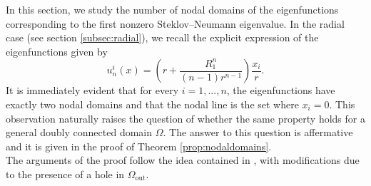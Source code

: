 \documentclass[12pt,reqno]{amsart}
\numberwithin{equation}{section}
\numberwithin{theorem}{section}
\numberwithin{equation}{section}
\numberwithin{theorem}{section}
\begin{document}
In this section, we study the number of nodal domains of the eigenfunctions corresponding to the first nonzero Steklov--Neumann eigenvalue. 
In the radial case (see section \ref{subsec:radial}), we recall the explicit expression of the eigenfunctions given by
\begin{equation*}
    u^i_n(x)= \left(r+\frac{R_1^n}{(n-1)r^{n-1}}\right)\frac{x_i}{r}.
 \end{equation*}
It is immediately evident that for every $i=1,...,n$, the eigenfunctions have exactly two nodal domains and that the nodal line is the set where $x_i=0$. This observation naturally raises the question of whether the same
property holds for a general doubly connected domain $\Omega$.
The answer to this question is affermative and it is given in the proof of Theorem \ref{prop:nodaldomains}.\\

 The arguments of the proof follow the idea contained in \cite{AM1994, KS1969}, with  modifications due to the  presence of a hole in $\Omega_\mathrm{out}$.
\end{document}
